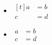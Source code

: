 \documentclass{article}
\begin{document}
\begin{itemize}
\item
$\begin{aligned}[t]
a&=b\\
c&=d
\end{aligned}$
\item
$\begin{aligned}
a&=b\\
c&=d
\end{aligned}$
\end{itemize}
\end{document}
